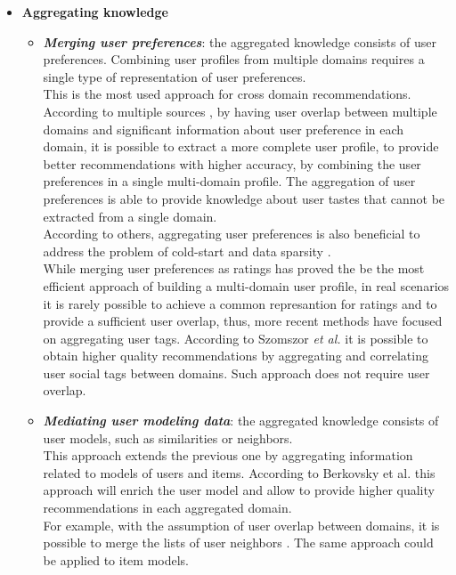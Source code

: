 \begin{itemize}
\item \textbf{Aggregating knowledge}
\begin{itemize}
\item \textbf{\textit{Merging user preferences}}: the aggregated knowledge consists of user preferences. Combining user profiles from multiple domains requires a single type of representation of user preferences.\\
This is the most used approach for cross domain recommendations. According to multiple sources \cite{10.1007/s11257-012-9131-2, 10.1007/978-3-540-88564-1_40, 10.1007/978-3-540-73078-1_44, 10.1145/1297231.1297238, 10.1007/s00354-008-0041-0}, by having user overlap between multiple domains and significant information about user preference in each domain, it is possible to extract a more complete user profile, to provide better recommendations with higher accuracy, by combining the user preferences in a single multi-domain profile. The aggregation of user preferences is able to provide knowledge about user tastes that cannot be extracted from a single domain.\\
According to others, aggregating user preferences is also beneficial to address the problem of cold-start \cite{10.1007/978-3-642-38844-6_25} and data sparsity \cite{10.1007/s11257-012-9128-x}.\\
While merging user preferences as ratings has proved the be the most efficient approach of building a multi-domain user profile, in real scenarios it is rarely possible to achieve a common represantion for ratings and to provide a sufficient user overlap, thus, more recent methods have focused on aggregating user tags. According to Szomszor \textit{et al.} \cite{10.1145/1379092.1379103, 10.1007/978-3-540-88564-1_40} it is possible to obtain higher quality recommendations by aggregating and correlating user social tags between domains. Such approach does not require user overlap.
\item \textbf{\textit{Mediating user modeling data}}: the aggregated knowledge consists of user models, such as similarities or neighbors.\\
This approach extends the previous one by aggregating information related to models of users and items. According to Berkovsky et al. \cite{10.1007/s11257-007-9042-9, 10.1007/11590323_22} this approach will enrich the user model and allow to provide higher quality recommendations in each aggregated domain.\\
For example, with the assumption of user overlap between domains, it is possible to merge the lists of user neighbors \cite{10.1145/1297231.1297238}. The same approach could be applied to item models.

\end{itemize}
\end{itemize}
